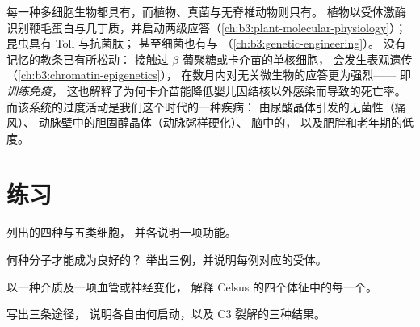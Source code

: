 \begin{remark}[处处皆有的先天免疫及其记忆]\label{rem:b3:innate-immunity:everywhere}
每一种多细胞生物都具有，而植物、真菌与无脊椎动物则只有。
植物以受体激酶识别鞭毛蛋白与几丁质，并启动两级应答（\cref{ch:b3:plant-molecular-physiology}）；
昆虫具有 Toll 与抗菌肽；
甚至细菌也有与 （\cref{ch:b3:genetic-engineering}）。
没有记忆的教条已有所松动：
接触过 $\beta$-葡聚糖或卡介苗的单核细胞，
会发生表观遗传（\cref{ch:b3:chromatin-epigenetics}），
在数月内对无关微生物的应答更为强烈——
即\emph{训练免疫}，
这也解释了为何卡介苗能降低婴儿因结核以外感染而导致的死亡率。
而该系统的过度活动是我们这个时代的一种疾病：
由尿酸晶体引发的无菌性（痛风）、
动脉壁中的胆固醇晶体（动脉粥样硬化）、
脑中的，
以及肥胖和老年期的低度。
\end{remark}

\section{练习}

\begin{exercise}[$\star$]\label{exo:b3:innate-immunity:1}
列出的四种与五类细胞，
并各说明一项功能。
\end{exercise}

\begin{exercise}[$\star$]\label{exo:b3:innate-immunity:2}
何种分子才能成为良好的？
举出三例，并说明每例对应的受体。
\end{exercise}

\begin{exercise}[$\star$]\label{exo:b3:innate-immunity:3}
以一种介质及一项血管或神经变化，
解释 Celsus 的四个体征中的每一个。
\end{exercise}

\begin{exercise}[$\star$]\label{exo:b3:innate-immunity:4}
写出三条途径，
说明各自由何启动，以及 C3 裂解的三种结果。
\end{exercise}

